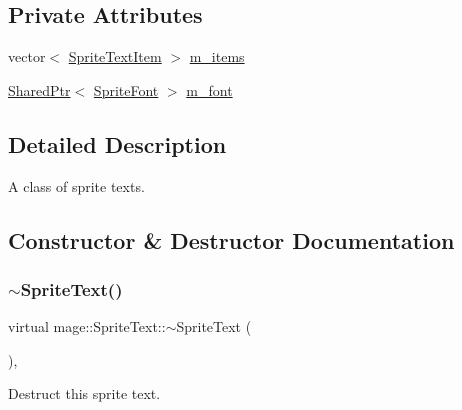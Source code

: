 \subsection*{Private Attributes}
\begin{DoxyCompactItemize}
\item 
vector$<$ \hyperlink{structmage_1_1_sprite_text_item}{Sprite\+Text\+Item} $>$ \hyperlink{classmage_1_1_sprite_text_a5990cef53a24dcd6d6bf0ff550145ca4}{m\+\_\+items}
\item 
\hyperlink{namespacemage_a1e01ae66713838a7a67d30e44c67703e}{Shared\+Ptr}$<$ \hyperlink{classmage_1_1_sprite_font}{Sprite\+Font} $>$ \hyperlink{classmage_1_1_sprite_text_a922e37fbcbc431e815ebabe82e4528b0}{m\+\_\+font}
\end{DoxyCompactItemize}


\subsection{Detailed Description}
A class of sprite texts. 

\subsection{Constructor \& Destructor Documentation}
\hypertarget{classmage_1_1_sprite_text_a0a231f260bb855b7be3280aa74a3e5c6}{}\label{classmage_1_1_sprite_text_a0a231f260bb855b7be3280aa74a3e5c6} 
\subsubsection{\texorpdfstring{$\sim$\+Sprite\+Text()}{~SpriteText()}}
{\footnotesize\ttfamily virtual mage\+::\+Sprite\+Text\+::$\sim$\+Sprite\+Text (\begin{DoxyParamCaption}{ }\end{DoxyParamCaption})\hspace{0.3cm}{\ttfamily [virtual]}, {\ttfamily [default]}}

Destruct this sprite text. \hypertarget{classmage_1_1_sprite_text_a929b24bba456bfd37a9ebf04db88d4c5}{}\label{classmage_1_1_sprite_text_a929b24bba456bfd37a9ebf04db88d4c5} 
